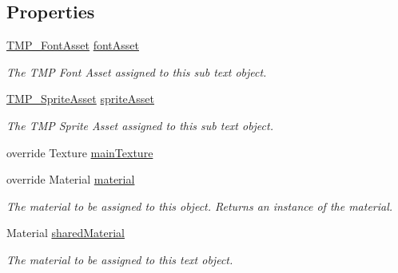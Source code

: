 \subsection*{Properties}
\begin{DoxyCompactItemize}
\item 
\mbox{\hyperlink{class_t_m_pro_1_1_t_m_p___font_asset}{T\+M\+P\+\_\+\+Font\+Asset}} \mbox{\hyperlink{class_t_m_pro_1_1_t_m_p___sub_mesh_u_i_ac26089f074be39cd7f88b0b2b36c9e6b}{font\+Asset}}
\begin{DoxyCompactList}\small\item\em The T\+MP Font Asset assigned to this sub text object. \end{DoxyCompactList}\item 
\mbox{\hyperlink{class_t_m_pro_1_1_t_m_p___sprite_asset}{T\+M\+P\+\_\+\+Sprite\+Asset}} \mbox{\hyperlink{class_t_m_pro_1_1_t_m_p___sub_mesh_u_i_a4d6484238e6c880ce9c7065cf9172db2}{sprite\+Asset}}
\begin{DoxyCompactList}\small\item\em The T\+MP Sprite Asset assigned to this sub text object. \end{DoxyCompactList}\item 
override Texture \mbox{\hyperlink{class_t_m_pro_1_1_t_m_p___sub_mesh_u_i_a455c7c479e81a37c0de77570b4bf3578}{main\+Texture}}
\item 
override Material \mbox{\hyperlink{class_t_m_pro_1_1_t_m_p___sub_mesh_u_i_a6bd5b75c3ee5ddfdda01f26c7052bb97}{material}}
\begin{DoxyCompactList}\small\item\em The material to be assigned to this object. Returns an instance of the material. \end{DoxyCompactList}\item 
Material \mbox{\hyperlink{class_t_m_pro_1_1_t_m_p___sub_mesh_u_i_a05ed962e084767f371f3971078a84ec7}{shared\+Material}}
\begin{DoxyCompactList}\small\item\em The material to be assigned to this text object. \end{DoxyCompactList}\item 

\end{DoxyCompactItemize}
